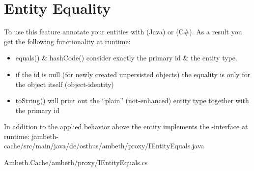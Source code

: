 \section{Entity Equality}
\label{feature:EntityEquals}
To use this feature annotate your entities with  (Java) or \type{[EntityEqualsAspect]} (C\#). As a result you get the following functionality at runtime:

\begin{itemize}
	\item equals() \& hashCode() consider exactly the primary id \& the entity type.
	\item if the id is null (for newly created unpersisted objects) the equality is only for the object itself (object-identity)
	\item toString() will print out the ``plain'' (not-enhanced) entity type together with the primary id
\end{itemize}


In addition to the applied behavior above the entity implements the -interface at runtime:
{jambeth-cache/src/main/java/de/osthus/ambeth/proxy/IEntityEquals.java}

{Ambeth.Cache/ambeth/proxy/IEntityEquals.cs}